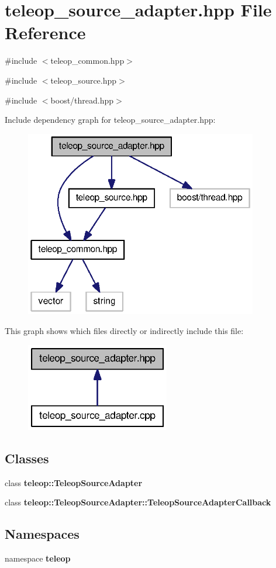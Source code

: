 \section{teleop\_\-source\_\-adapter.hpp File Reference}
\label{teleop__source__adapter_8hpp}
{\ttfamily \#include $<$teleop\_\-common.hpp$>$}\par
{\ttfamily \#include $<$teleop\_\-source.hpp$>$}\par
{\ttfamily \#include $<$boost/thread.hpp$>$}\par
Include dependency graph for teleop\_\-source\_\-adapter.hpp:
\nopagebreak
\begin{figure}[H]
\begin{center}
\leavevmode
\includegraphics[width=288pt]{teleop__source__adapter_8hpp__incl}
\end{center}
\end{figure}
This graph shows which files directly or indirectly include this file:
\nopagebreak
\begin{figure}[H]
\begin{center}
\leavevmode
\includegraphics[width=178pt]{teleop__source__adapter_8hpp__dep__incl}
\end{center}
\end{figure}
\subsection*{Classes}
\begin{DoxyCompactItemize}
\item 
class {\bf teleop::TeleopSourceAdapter}
\item 
class {\bf teleop::TeleopSourceAdapter::TeleopSourceAdapterCallback}
\end{DoxyCompactItemize}
\subsection*{Namespaces}
\begin{DoxyCompactItemize}
\item 
namespace {\bf teleop}
\end{DoxyCompactItemize}

